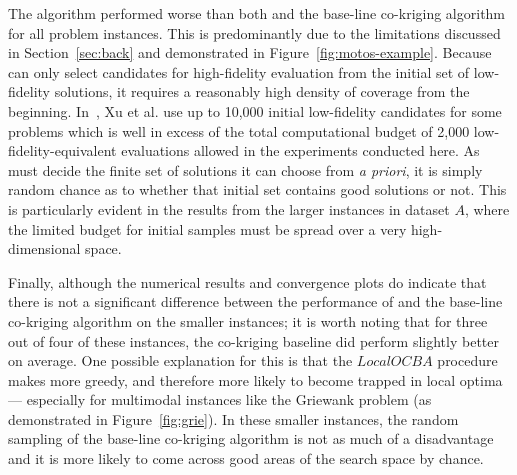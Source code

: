 The \motos{} algorithm performed worse than both \AlgName{} and the base-line co-kriging algorithm for all problem instances. This is predominantly due to the limitations discussed in Section~\ref{sec:back} and demonstrated in Figure~\ref{fig:motos-example}. Because \motos{} can only select candidates for high-fidelity evaluation from the initial set of low-fidelity solutions, it requires a reasonably high density of coverage from the beginning. In~\cite{xu2016mo2tos}, Xu et al. use up to 10,000 initial low-fidelity candidates for some problems which is well in excess of the total computational budget of 2,000 low-fidelity-equivalent evaluations allowed in the experiments conducted here. As \motos{} must decide the finite set of solutions it can choose from \emph{a priori}, it is simply random chance as to whether that initial set contains good solutions or not. This is particularly evident in the results from the larger instances in dataset $A$, where the limited budget for initial samples must be spread over a very high-dimensional space.

Finally, although the numerical results and convergence plots do indicate that there is not a significant difference between the performance of \AlgName{} and the base-line co-kriging algorithm on the smaller instances; it is worth noting that for three out of four of these instances, the co-kriging baseline did perform slightly better on average. One possible explanation for this is that the $LocalOCBA$ procedure makes \AlgName{} more greedy, and therefore more likely to become trapped in local optima --- especially for multimodal instances like the Griewank problem (as demonstrated in Figure~\ref{fig:grie}). In these smaller instances, the random sampling of the base-line co-kriging algorithm is not as much of a disadvantage and it is more likely to come across good areas of the search space by chance.